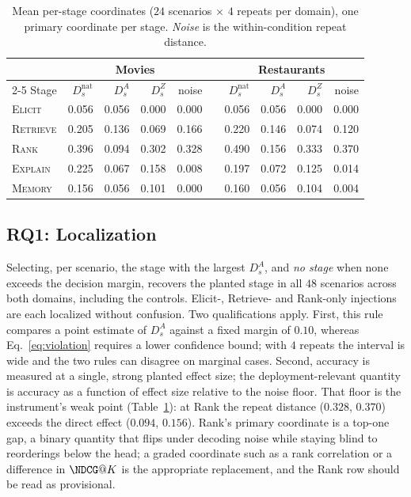 \documentclass[runningheads]{llncs}
\newcommand{\stage}[1]{\textsc{#1}}
\begin{document}
\begin{table}[t]
\centering
\caption{Mean per-stage coordinates ($24$ scenarios $\times$ $4$ repeats per domain), one primary
coordinate per stage. \emph{Noise} is the within-condition repeat distance.}
\label{tab:controlled-coords}
\scriptsize
\setlength{\tabcolsep}{4pt}
\begin{tabular}{@{}l rrrr c rrrr@{}}
\toprule
 & \multicolumn{4}{c}{Movies} & & \multicolumn{4}{c}{Restaurants} \\
\cmidrule{2-5}\cmidrule{7-10}
Stage & $D_s^{\mathrm{nat}}$ & $D_s^{A}$ & $D_s^{Z}$ & noise & &
        $D_s^{\mathrm{nat}}$ & $D_s^{A}$ & $D_s^{Z}$ & noise \\
\midrule
\stage{Elicit}   & 0.056 & 0.056 & 0.000 & 0.000 & & 0.056 & 0.056 & 0.000 & 0.000 \\
\stage{Retrieve} & 0.205 & 0.136 & 0.069 & 0.166 & & 0.220 & 0.146 & 0.074 & 0.120 \\
\stage{Rank}     & 0.396 & 0.094 & 0.302 & 0.328 & & 0.490 & 0.156 & 0.333 & 0.370 \\
\stage{Explain}  & 0.225 & 0.067 & 0.158 & 0.008 & & 0.197 & 0.072 & 0.125 & 0.014 \\
\stage{Memory}   & 0.156 & 0.056 & 0.101 & 0.000 & & 0.160 & 0.056 & 0.104 & 0.004 \\
\bottomrule
\end{tabular}
\end{table}

\subsection{RQ1: Localization}

Selecting, per scenario, the stage with the largest $D_s^{A}$, and \emph{no stage} when none
exceeds the decision margin, recovers the planted stage in all $48$ scenarios across both
domains, including the controls. Elicit-, Retrieve- and Rank-only injections are each localized
without confusion. Two qualifications apply. First, this rule compares a point estimate of
$D_s^A$ against a fixed margin of $0.10$, whereas Eq.~\eqref{eq:violation} requires a lower
confidence bound; with $4$ repeats the interval is wide and the two rules can disagree on
marginal cases. Second, accuracy is measured at a single, strong planted effect size; the
deployment-relevant quantity is accuracy as a function of effect size relative to the noise
floor. That floor is the instrument's weak point (Table~\ref{tab:controlled-coords}): at Rank the
repeat distance ($0.328$, $0.370$) exceeds the direct effect ($0.094$, $0.156$). Rank's primary
coordinate is a top-one gap, a binary quantity that flips under decoding noise while staying
blind to reorderings below the head; a graded coordinate such as a rank correlation or a
difference in $\NDCG@K$ is the appropriate replacement, and the Rank row should be read as
provisional.
\end{document}
